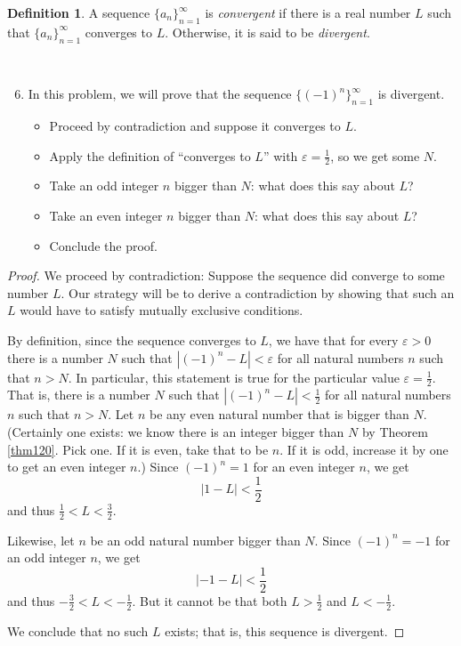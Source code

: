 \documentclass[12pt]{amsart}
\def\e{\varepsilon}
\numberwithin{equation}{section}
\theoremstyle{plain} %
\theoremstyle{definition}
\newtheorem{defn}[equation]{Definition}
\theoremstyle{remark}
\begin{document}
\begin{defn} A sequence $\{a_n\}_{n=1}^\infty$ is \emph{convergent} if there is a real number $L$ such that $\{a_n\}_{n=1}^\infty$ converges to $L$. Otherwise, it is said to be \emph{divergent}.
\end{defn}

\

\begin{enumerate}\setcounter{enumi}{5}
\item In this problem, we will prove that the sequence $\{ (-1)^{n} \}_{n=1}^\infty$ is divergent.

\begin{itemize}
\item Proceed by contradiction and suppose it converges to $L$.
\item Apply the definition of ``converges to $L$'' with $\e = \frac{1}{2}$, so we get some $N$.
\item Take an odd integer $n$ bigger than $N$: what does this say about $L$?
\item  Take an even integer $n$ bigger than $N$: what does this say about $L$?
\item Conclude the proof.
\end{itemize}
\end{enumerate}
\begin{framed}
\begin{proof}
  We proceed by contradiction: Suppose the sequence did converge to some number $L$. Our strategy will be to derive a contradiction by showing that such
  an $L$ would have to satisfy mutually exclusive conditions. 

By definition, since the sequence converges to $L$, we have that 
for every $\e > 0$ there is a number $N$ such that 
$|(-1)^n - L| < \e$
for all natural numbers $n$ such that $n > N$.
In particular, this statement is true for the particular value $\e = \frac12$. That is,  there is a number $N$ such that  
$|(-1)^n - L| < \frac12$ for all natural numbers $n$ such that  
$n > N$. Let $n$ be any even natural number that is bigger than
$N$. (Certainly one exists: we know there is an integer bigger than
$N$
by Theorem \ref{thm120}. Pick one. If it is even, take that to be
$n$. If it is odd, increase it by one to get an even integer $n$.)  Since $(-1)^n = 1$ for an even integer $n$, we get
$$
|1 - L| < \frac12
$$
and thus $\frac12 < L < \frac32$.

Likewise, let $n$ be an odd natural number bigger than $N$. Since $(-1)^n = -1$ for an odd integer $n$, we get
$$
|-1 - L| < \frac12
$$
and thus $-\frac32 < L < -\frac12$. But it cannot be that both $L > \frac12$ and $L < -\frac12$.

We conclude that no such $L$ exists; that is, this sequence is divergent.
\end{proof}
\end{framed}
\end{document}
